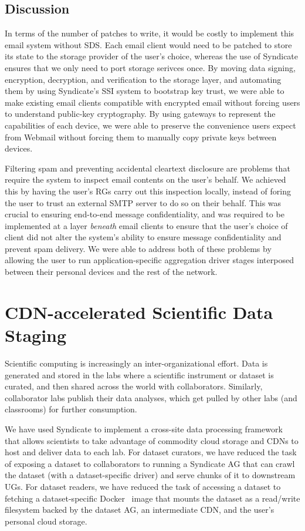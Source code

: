 \subsection{Discussion}

In terms of the number of patches to write, it would be costly to implement this email system without
SDS.  Each email client would need to be patched to store its state to the
storage provider of the user's choice, whereas the use of Syndicate ensures that
we only need to port storage serivces once.  By moving data signing,
encryption, decryption, and verification to the storage layer, and automating
them by using Syndicate's SSI system to bootstrap key trust, we were able to
make existing email clients compatible with encrypted email without forcing
users to understand public-key cryptography.  By using gateways to represent the
capabilities of each device, we were able to preserve the convenience users expect from Webmail
without forcing them to manually copy private keys between devices.

Filtering spam and preventing accidental cleartext disclosure are problems
that require the system to inspect email contents on the user's behalf.  We
achieved this by having the user's RGs carry out this inspection locally,
instead of foring the user to trust an external SMTP server to do so on their
behalf.  This was crucial to ensuring end-to-end message confidentiality, and
was required to be implemented at a layer \emph{beneath} email clients to ensure
that the user's choice of client did not alter the system's ability to ensure
message confidentiality and prevent spam delivery.  We were able
to address both of these problems by
allowing the user to run application-specific aggregation driver
stages interposed between their personal devices and the rest of the network.

\section{CDN-accelerated Scientific Data Staging}

Scientific computing is increasingly an inter-organizational effort.  Data is
generated and stored in the labs where a scientific instrument or dataset is
curated, and then shared across the world with collaborators.  Similarly,
collaborator labs publish their data analyses, which get pulled by other labs
(and classrooms) for further consumption.

We have used Syndicate to implement a cross-site data processing framework that
allows scientists to take advantage of commodity cloud storage and CDNs to host
and deliver data to each lab.  For dataset curators, we have reduced the task of
exposing a dataset to collaborators to running a Syndicate AG that can crawl the
dataset (with a dataset-specific driver) and serve chunks of it to downstream
UGs.  For dataset readers, we have reduced the task of accessing a dataset to
fetching a dataset-specific Docker~\cite{docker} image that mounts the dataset
as a read/write filesystem backed by the dataset AG, an intermediate CDN, and
the user's personal cloud storage.

